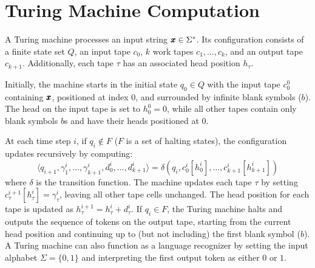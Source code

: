\section{Turing Machine Computation}
\label{appen:turningDetails}
A Turing machine processes an input string $\pmb{x} \in \Sigma^{*}$. Its configuration consists of a finite state set $Q$, an input tape $c_0$, $k$ work tapes $c_1, \dots, c_k$, and an output tape $c_{k+1}$. Additionally, each tape $\tau$ has an associated head position $h_\tau$.  

Initially, the machine starts in the initial state $q_0 \in Q$ with the input tape $c_0^0$ containing $\pmb{x}$, positioned at index $0$, and surrounded by infinite blank symbols ($b$). The head on the input tape is set to $h_0^0 = 0$, while all other tapes contain only blank symbols $b$s and have their heads positioned at $0$.  

At each time step $i$, if $q_i \notin F$ ($F$ is a set of halting states), the configuration updates recursively by computing:  
\[
\langle q_{i+1}, \gamma_1^i, \dots, \gamma_{k+1}^i, d_0^i, \dots, d_{k+1}^i \rangle = \delta(q_i, c_0^i[h_0^i], \dots, c_{k+1}^i[h_{k+1}^i])
\]  
where $\delta$ is the transition function. The machine updates each tape $\tau$ by setting $c_\tau^{i+1}[h_\tau^i] = \gamma_\tau^i$, leaving all other tape cells unchanged. The head position for each tape is updated as $h_\tau^{i+1} = h_\tau^i + d_\tau^i$.  If $q_i \in F$, the Turing machine halts and outputs the sequence of tokens on the output tape, starting from the current head position and continuing up to (but not including) the first blank symbol ($b$). A Turing machine can also function as a language recognizer by setting the input alphabet $\Sigma = \{0,1\}$ and interpreting the first output token as either $0$ or $1$.


